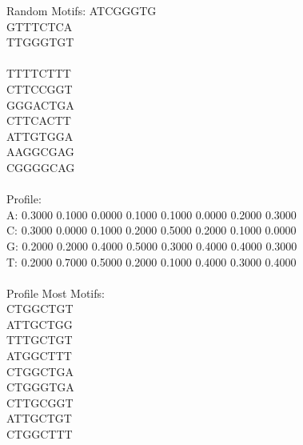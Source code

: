 \documentclass{report}
\begin{document}
Random Motifs:
ATCGGGTG\\
GTTTCTCA\\
TTGGGTGT\\\\
TTTTCTTT\\
CTTCCGGT\\
GGGACTGA\\
CTTCACTT\\
ATTGTGGA\\
AAGGCGAG\\
CGGGGCAG\\
\\
Profile:\\
A: 0.3000 0.1000 0.0000 0.1000 0.1000 0.0000 0.2000 0.3000\\
C: 0.3000 0.0000 0.1000 0.2000 0.5000 0.2000 0.1000 0.0000\\
G: 0.2000 0.2000 0.4000 0.5000 0.3000 0.4000 0.4000 0.3000\\
T: 0.2000 0.7000 0.5000 0.2000 0.1000 0.4000 0.3000 0.4000\\
\\
Profile Most Motifs:\\
CTGGCTGT\\
ATTGCTGG\\
TTTGCTGT\\
ATGGCTTT\\
CTGGCTGA\\
CTGGGTGA\\
CTTGCGGT\\
ATTGCTGT\\
CTGGCTTT\\
\end{document}
